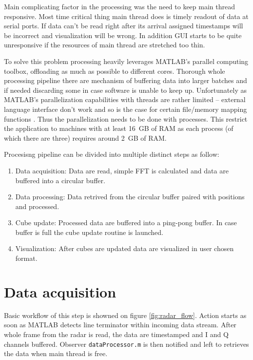 Main complicating factor in the processing was the need to keep main thread responsive.
Most time critical thing main thread does is timely readout of data at serial ports.
If data can't be read right after its arrival assigned timestamps will be incorrect and visualization will be wrong.
In addition GUI starts to be quite unresponsive if the resources of main thread are stretched too thin.

To solve this problem processing heavily leverages MATLAB's parallel computing toolbox, offloading as much as possible to different cores.
Thorough whole processing pipeline there are mechanism of buffering data into larger batches and if needed discarding some in case software is unable to keep up.
Unfortunately as MATLAB's parallelization capabilities with threads are rather limited  -- external language interface don't work and so is the case for certain file/memory mapping functions \cite{matlabParallel}.
Thus the parallelization needs to be done with processes.
This restrict the application to machines with at least 16~GB of RAM as each process (of which there are three) requires around 2~GB of RAM.

Procesisng pipeline can be divided into multiple distinct steps as follow:
\begin{enumerate}
  \item Data acquisition: Data are read, simple FFT is calculated and data are buffered into a circular buffer.
  \item Data processing: Data retrived from the  circular buffer paired with positions and processed.
  \item Cube update: Processed data are buffered into a ping-pong buffer. In case buffer is full the cube update routine is launched.
  \item Visualization: After cubes are updated data are visualized in user chosen format.
\end{enumerate}

\section{Data acquisition}

Basic workflow of this step is showned on figure \ref{fig:radar_flow}.
Action starts as soon as MATLAB detects line terminator within incoming data stream.
After whole frame from the radar is read, the data are timestamped and I and Q channels buffered.
Observer \texttt{dataProcessor.m} is then notified and left to  retrieves the data when main thread is free.


